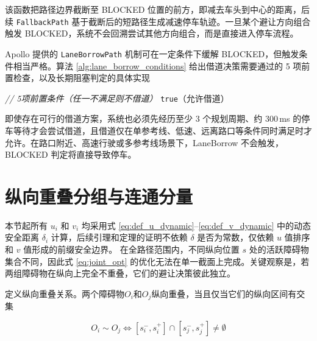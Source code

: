 该函数把路径边界截断至 BLOCKED 位置的前方，即减去车头到中心的距离，后续 \texttt{FallbackPath} 基于截断后的短路径生成减速停车轨迹。一旦某个避让方向组合触发 BLOCKED，系统不会回溯尝试其他方向组合，而是直接进入停车流程。

Apollo 提供的 \texttt{LaneBorrowPath} 机制可在一定条件下缓解 BLOCKED，但触发条件相当严格。算法 \ref{alg:lane_borrow_conditions} 给出借道决策需要通过的 5 项前置检查，以及长期阻塞判定的具体实现

\begin{algorithm}[htbp]
\caption{LaneBorrowPath的前置条件与长期阻塞判定}
\label{alg:lane_borrow_conditions}
\textcolor{gray!30!black}{\textit{// 5项前置条件（任一不满足则不借道）}}\;
\KwRet \texttt{true}（允许借道）\;
\end{algorithm}

即使存在可行的借道方案，系统也必须先经历至少 3 个规划周期、约 300\,ms 的停车等待才会尝试借道，且借道仅在单参考线、低速、远离路口等条件同时满足时才允许。在路口附近、高速行驶或多参考线场景下，LaneBorrow 不会触发，BLOCKED 判定将直接导致停车。
\section{纵向重叠分组与连通分量}
\label{sec:grouping_connected}
本节起所有 $u_i$ 和 $v_i$ 均采用式 \eqref{eq:def_u_dynamic}--\eqref{eq:def_v_dynamic} 中的动态安全距离 $\delta_i$ 计算，后续引理和定理的证明不依赖 $\delta$ 是否为常数，仅依赖 $u$ 值排序和 $v$ 值形成的前缀安全边界。
在全路径范围内，不同纵向位置 $s$ 处的活跃障碍物集合不同，因此式 \eqref{eq:joint_opt} 的优化无法在单一截面上完成。关键观察是，若两组障碍物在纵向上完全不重叠，它们的避让决策彼此独立。

定义纵向重叠关系。两个障碍物$O_i$和$O_j$纵向重叠，当且仅当它们的纵向区间有交集

\begin{equation}
    O_i \sim O_j \iff [s_i^{-}, s_i^{+}] \cap [s_j^{-}, s_j^{+}] \neq \emptyset
    \label{eq:overlap_relation}
\end{equation}

